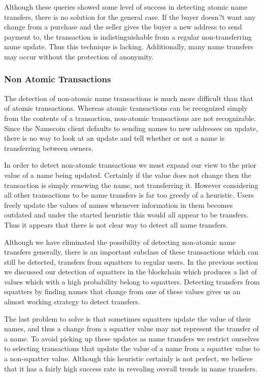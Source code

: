 Although these queries showed some level of success in detecting atomic name transfers, there is no solution for the general case. If the buyer doesn?t want any change from a purchase and the seller gives the buyer a new address to send payment to, the transaction is indistinguishable from a regular non-transferring name update. Thus this technique is lacking. Additionally, many name transfers may occur without the protection of anonymity.

\subsubsection{Non Atomic Transactions}

The detection of non-atomic name transactions is much more difficult than that of atomic transactions. Whereas atomic transactions can be recognized simply from the contents of a transaction, non-atomic transactions are not recognizable.  Since the Namecoin client defaults to sending names to new addresses on update, there is no way to look at an update and tell whether or not a name is transferring between owners.

In order to detect non-atomic transactions we must expand our view to the prior value of a name being updated. Certainly if the value does not change then the transaction is simply renewing the name, not transferring it. However considering all other transactions to be name transfers is far too greedy of a heuristic. Users freely update the values of names whenever information in them becomes outdated and under the started heuristic this would all appear to be transfers. Thus it appears that there is not clear way to detect all name transfers.

Although we have eliminated the possibility of detecting non-atomic name transfers generally, there is an important subclass of these transactions which can still be detected, transfers from squatters to regular users. In the previous section we discussed our detection of squatters in the blockchain which produces a list of values which with a high probability belong to squatters. Detecting transfers from squatters by finding names that change from one of these values gives us an almost working strategy to detect transfers.

The last problem to solve is that sometimes squatters update the value of their names, and thus a change from a squatter value may not represent the transfer of a name. To avoid picking up these updates as name transfers we restrict ourselves to selecting transactions that update the value of a name from a squatter value to a non-squatter value. Although this heuristic certainly is not perfect, we believe that it has a fairly high success rate in revealing overall trends in name transfers.

\textbf{}
	